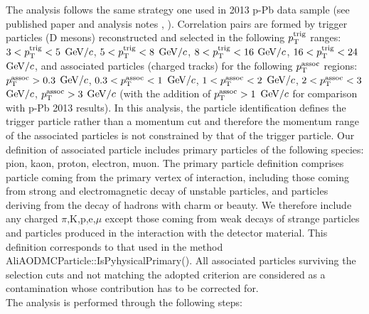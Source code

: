 The analysis follows the same strategy one used in 2013 p-Pb data sample (see published paper \cite{ALICEDhcorr} and analysis notes \cite{Notepp}, \cite{NotepPb}). Correlation pairs are formed by
trigger particles (D mesons) reconstructed and selected in the following $p_{\rm T}^{\rm trig}$ ranges: $3<p_{\rm T}^{\rm trig}<5$ $\mathrm{GeV}/c$, $5<p_{\rm T}^{\rm trig}<8$ $\mathrm{GeV}/c$, $8<p_{\rm T}^{\rm trig}<16$ $\mathrm{GeV}/c$, $16<p_{\rm T}^{\rm trig}<24$ $\mathrm{GeV}/c$, and associated particles (charged tracks) for the following $p_{\rm T}^{\rm assoc}$ regions: $p_{\rm T}^{\rm assoc}>0.3$ $\mathrm{GeV}/c$, $0.3<p_{\rm T}^{\rm assoc}<1$ $\mathrm{GeV}/c$, $1<p_{\rm T}^{\rm assoc}<2$ $\mathrm{GeV}/c$, $2<p_{\rm T}^{\rm assoc}<3$ $\mathrm{GeV}/c$, $p_{\rm T}^{\rm assoc}>3$ $\mathrm{GeV}/c$ (with the addition of $p_{\rm T}^{\rm assoc}>1$ $\mathrm{GeV}/c$ for comparison with p-Pb 2013 results). In this analysis, the particle identification defines the trigger particle rather than a momentum cut and therefore the momentum range of the associated particles is not constrained by that of the trigger particle. Our definition of associated particle includes primary particles of the following species: pion, kaon, proton, electron, muon. The primary particle definition comprises particle coming from the primary vertex of interaction, including those coming from strong and electromagnetic decay of unstable particles, and particles deriving from the decay of hadrons with charm or beauty.
We therefore include any charged $\pi$,K,p,e,$\mu$ except those coming from weak decays of strange particles and particles produced in the interaction with the detector material. This definition corresponds to that used in the method AliAODMCParticle::IsPyhysicalPrimary().
All associated particles surviving the selection cuts and not matching the adopted criterion are considered as a contamination whose contribution has to be corrected for. \\

The analysis is performed through the following steps:

